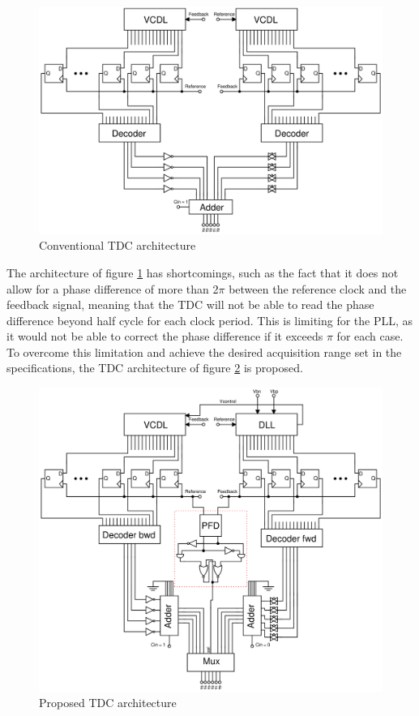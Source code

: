 \begin{figure}[h]
    \centering
    \includegraphics[width=1\textwidth]{figures/TDC_conventional_architecture.png}
    \caption{Conventional TDC architecture}
    \label{fig:TDC_conventional_architecture}
\end{figure}

The architecture of figure \ref{fig:TDC_conventional_architecture} has shortcomings, such as the fact that it does not allow for a phase difference of more than 2$\pi$ between the
reference clock and the feedback signal, meaning that the TDC will not be able to read the phase difference beyond half cycle for each clock period. This is limiting for the PLL, as it
would not be able to correct the phase difference if it exceeds $\pi$ for each case. To overcome this limitation and achieve the desired acquisition range set in the specifications, 
the TDC architecture of figure \ref{fig:TDC_proposed_architecture} is proposed.

\begin{figure}[h]
    \centering
    \includegraphics[width=1\textwidth]{figures/TDC_proposed_architecture.png}
    \caption{Proposed TDC architecture}
    \label{fig:TDC_proposed_architecture}
\end{figure}

